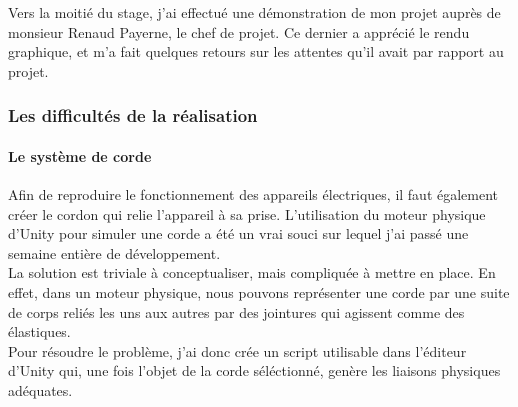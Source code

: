 \documentclass[a4paper]{article}
\begin{document}
    Vers la moitié du stage, j'ai effectué une démonstration de mon projet auprès de monsieur Renaud Payerne, le chef de projet. Ce dernier a apprécié le rendu graphique, et m'a fait quelques retours sur les attentes qu'il avait par rapport au projet. \\

    \subsubsection{Les difficultés de la réalisation}

    \paragraph{Le système de corde}

    Afin de reproduire le fonctionnement des appareils électriques, il faut également créer le cordon qui relie l'appareil à sa prise. L'utilisation du moteur physique d'Unity pour simuler une corde a été un vrai souci sur lequel j'ai passé une semaine entière de développement. \\

    La solution est triviale à conceptualiser, mais compliquée à mettre en place. En effet, dans un moteur physique, nous pouvons représenter une corde par une suite de corps reliés les uns aux autres par des jointures qui agissent comme des élastiques. \\

    Pour résoudre le problème, j'ai donc crée un script utilisable dans l'éditeur d'Unity qui, une fois l'objet de la corde séléctionné, genère les liaisons physiques adéquates. \\ 
\end{document}
